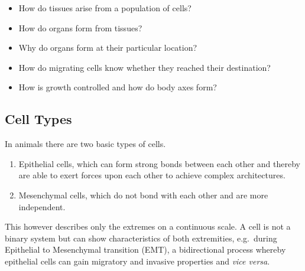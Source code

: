 \documentclass[11pt,singlespacinge,twoside]{reedthesis} %
\providecommand{\tightlist}{%
  \setlength{\itemsep}{0pt}\setlength{\parskip}{0pt}}
\begin{document}
\begin{itemize}
\tightlist
\item
  How do tissues arise from a population of cells?
\item
  How do organs form from tissues?
\item
  Why do organs form at their particular location?
\item
  How do migrating cells know whether they reached their destination?
\item
  How is growth controlled and how do body axes form?
\end{itemize}
\hypertarget{cell-types}{%
\subsection{Cell Types}\label{cell-types}}

In animals there are two basic types of cells.
\begin{enumerate}
\def\labelenumi{\arabic{enumi}.}
\tightlist
\item
  Epithelial cells, which can form strong bonds between each other and thereby are able to exert forces upon each other to achieve complex architectures.
\item
  Mesenchymal cells, which do not bond with each other and are more independent.
\end{enumerate}
This however describes only the extremes on a continuous scale. A cell is not a binary system but can show characteristics of both extremities, e.g.~during Epithelial to Mesenchymal transition (EMT), a bidirectional process whereby epithelial cells can gain migratory and invasive properties and \emph{vice versa}.
\end{document}
